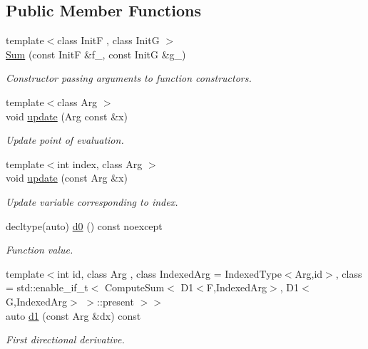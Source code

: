 \subsection*{Public Member Functions}
\begin{DoxyCompactItemize}
\item 
{\footnotesize template$<$class Init\+F , class Init\+G $>$ }\\\hyperlink{structFunG_1_1MathematicalOperations_1_1Sum_ac19577debb0ed58ab8dc809e46d5d18c}{Sum} (const Init\+F \&f\+\_\+, const Init\+G \&g\+\_\+)
\begin{DoxyCompactList}\small\item\em Constructor passing arguments to function constructors. \end{DoxyCompactList}\item 
{\footnotesize template$<$class Arg $>$ }\\void \hyperlink{structFunG_1_1MathematicalOperations_1_1Sum_abd35f8e65137de573ec0d0176c986d15}{update} (Arg const \&x)
\begin{DoxyCompactList}\small\item\em Update point of evaluation. \end{DoxyCompactList}\item 
{\footnotesize template$<$int index, class Arg $>$ }\\void \hyperlink{structFunG_1_1MathematicalOperations_1_1Sum_abbd7d6de535c953ddf3b79a2896e8068}{update} (const Arg \&x)
\begin{DoxyCompactList}\small\item\em Update variable corresponding to index. \end{DoxyCompactList}\item 
decltype(auto) \hyperlink{structFunG_1_1MathematicalOperations_1_1Sum_ac95658b8dae3f165fe612f056daecb30}{d0} () const noexcept
\begin{DoxyCompactList}\small\item\em Function value. \end{DoxyCompactList}\item 
{\footnotesize template$<$int id, class Arg , class Indexed\+Arg  = Indexed\+Type$<$\+Arg,id$>$, class  = std\+::enable\+\_\+if\+\_\+t$<$ Compute\+Sum$<$ D1$<$\+F,\+Indexed\+Arg$>$, D1$<$\+G,\+Indexed\+Arg$>$ $>$\+::present $>$$>$ }\\auto \hyperlink{structFunG_1_1MathematicalOperations_1_1Sum_a0327f21277ac4babad3a8f74ed99a3ed}{d1} (const Arg \&dx) const 
\begin{DoxyCompactList}\small\item\em First directional derivative. \end{DoxyCompactList}\item 

\end{DoxyCompactItemize}
